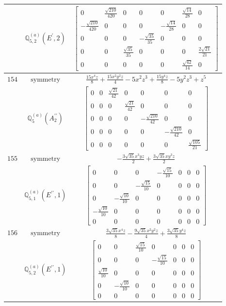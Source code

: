 \documentclass[fleqn,8pt,landscape]{jsarticle}
\begin{document}
\begin{longtable}{ccc}
$  $ & $ \mathbb{Q}_{5,2}^{(a)}(E^{\prime},2) $ & $ \begin{bmatrix} 0 & \frac{\sqrt{210}}{420} & 0 & 0 & 0 & \frac{\sqrt{14}}{28} & 0 \\ - \frac{\sqrt{210}}{420} & 0 & 0 & 0 & - \frac{\sqrt{14}}{28} & 0 & 0 \\ 0 & 0 & 0 & - \frac{\sqrt{35}}{35} & 0 & 0 & 0 \\ 0 & 0 & \frac{\sqrt{35}}{35} & 0 & 0 & 0 & \frac{2 \sqrt{21}}{21} \\ 0 & 0 & 0 & 0 & 0 & \frac{\sqrt{42}}{14} & 0 \end{bmatrix} $ \\ \hline
$ 154 $ & $ \text{symmetry} $ & $ \frac{15 x^{4} z}{8} + \frac{15 x^{2} y^{2} z}{4} - 5 x^{2} z^{3} + \frac{15 y^{4} z}{8} - 5 y^{2} z^{3} + z^{5} $ \\
$  $ & $ \mathbb{Q}_{5}^{(a)}(A_{2}^{\prime\prime}) $ & $ \begin{bmatrix} 0 & 0 & \frac{\sqrt{21}}{42} & 0 & 0 & 0 & 0 \\ 0 & 0 & 0 & \frac{\sqrt{21}}{42} & 0 & 0 & 0 \\ 0 & 0 & 0 & 0 & - \frac{\sqrt{210}}{42} & 0 & 0 \\ 0 & 0 & 0 & 0 & 0 & - \frac{\sqrt{210}}{42} & 0 \\ 0 & 0 & 0 & 0 & 0 & 0 & \frac{\sqrt{105}}{21} \end{bmatrix} $ \\ \hline
$ 155 $ & $ \text{symmetry} $ & $ - \frac{3 \sqrt{35} x^{3} y z}{2} + \frac{3 \sqrt{35} x y^{3} z}{2} $ \\
$  $ & $ \mathbb{Q}_{5,1}^{(a)}(E^{\prime\prime},1) $ & $ \begin{bmatrix} 0 & 0 & 0 & - \frac{\sqrt{15}}{10} & 0 & 0 & 0 \\ 0 & 0 & - \frac{\sqrt{15}}{10} & 0 & 0 & 0 & 0 \\ 0 & - \frac{\sqrt{10}}{10} & 0 & 0 & 0 & 0 & 0 \\ - \frac{\sqrt{10}}{10} & 0 & 0 & 0 & 0 & 0 & 0 \\ 0 & 0 & 0 & 0 & 0 & 0 & 0 \end{bmatrix} $ \\ \hline
$ 156 $ & $ \text{symmetry} $ & $ \frac{3 \sqrt{35} x^{4} z}{8} - \frac{9 \sqrt{35} x^{2} y^{2} z}{4} + \frac{3 \sqrt{35} y^{4} z}{8} $ \\
$  $ & $ \mathbb{Q}_{5,2}^{(a)}(E^{\prime\prime},1) $ & $ \begin{bmatrix} 0 & 0 & \frac{\sqrt{15}}{10} & 0 & 0 & 0 & 0 \\ 0 & 0 & 0 & - \frac{\sqrt{15}}{10} & 0 & 0 & 0 \\ \frac{\sqrt{10}}{10} & 0 & 0 & 0 & 0 & 0 & 0 \\ 0 & - \frac{\sqrt{10}}{10} & 0 & 0 & 0 & 0 & 0 \\ 0 & 0 & 0 & 0 & 0 & 0 & 0 \end{bmatrix} $ \\ \hline

\end{longtable}
\end{document}
